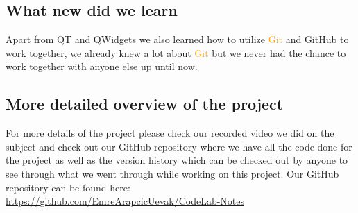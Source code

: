 \documentclass[a4paper, 11pt]{article}
\begin{document}
			\subsection{What new did we learn}
				\noindent Apart from QT and QWidgets we also learned how to utilize \textcolor{orange}{Git} and GitHub to work together, we already knew a lot about \textcolor{orange}{Git} but we never had the chance to work together with anyone else up until now.
			\subsection{More detailed overview of the project}
				\noindent For more details of the project please check our recorded video we did on the subject and check out our GitHub repository where we have all the code done for the project as well as the version history which can be checked out by anyone to see through what we went through while working on this project. Our GitHub repository can be found here:\\ \textcolor{blue}{\url{https://github.com/EmreArapcicUevak/CodeLab-Notes}}
\end{document}
